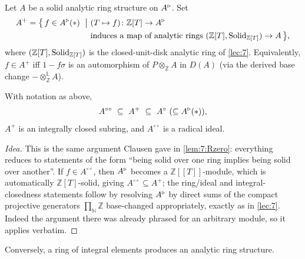 \begin{definition}
\label{def:8:Aplus-from-analytic}
Let $A$ be a solid analytic ring structure on $A^{\triangleright}$. Set
\begin{equation*}
\begin{aligned}
A^{+}=\bigl\{\,f\in A^{\triangleright}(\ast)\ \bigm|\ & (T\mapsto f)\colon\mathbb{Z}[T]\to A^{\triangleright}\\
&\text{induces a map of analytic rings }(\mathbb{Z}[T],\mathrm{Solid}_{\mathbb{Z}[T]})\to A\,\bigr\},
\end{aligned}
\end{equation*}
where $(\mathbb{Z}[T],\mathrm{Solid}_{\mathbb{Z}[T]})$ is the closed-unit-disk analytic
ring of \cref{lec:7}. Equivalently, $f\in A^{+}$ iff $1-f\sigma$ is an
automorphism of $P\otimes_{\mathbb{Z}}A$ in $D(A)$ (via the derived base change
$-\otimes^{\mathbb{L}}_{\mathbb{Z}}A$).
\end{definition}

\begin{proposition}
\label{prop:8:Aplus-integrally-closed}
With notation as above,
\begin{equation*}
A^{\circ\circ}\ \subseteq\ A^{+}\ \subseteq\ A^{\circ}\ (\subseteq\ur A(\ast)),
\end{equation*}
$A^{+}$ is an integrally closed subring, and $A^{\circ\circ}$ is a radical ideal.
\end{proposition}

\begin{proof}[Idea]
This is the same argument Clausen gave in \cref{lem:7:Rzero}: everything reduces
to statements of the form ``being solid over one ring implies being solid over
another''. If $f\in A^{\circ\circ}$, then $A^{\triangleright}$ becomes a
$\mathbb{Z}[\![T]\!]$-module, which is automatically $\mathbb{Z}[T]$-solid, giving
$A^{\circ\circ}\subseteq A^{+}$; the ring/ideal and integral-closedness
statements follow by resolving $A^{\triangleright}$ by direct sums of the compact projective
generators $\prod_{\mathbb{N}}\mathbb{Z}$ base-changed appropriately, exactly as
in \cref{lec:7}. Indeed the argument there was already phrased for an arbitrary
module, so it applies verbatim.
\end{proof}

Conversely, a ring of integral elements produces an analytic ring structure.


